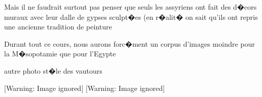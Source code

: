\documentclass{article}
\begin{document}
Mais il ne faudrait surtout pas penser que seuls les assyriens ont fait des d�cors muraux avec leur dalle de gypses sculpt�es (en r�alit� on sait qu'ils ont repris une ancienne tradition de peinture


\bigskip

Durant tout ce cours, nous aurons forc�ment un corpus d'images moindre pour la M�sopotamie que pour l'Egypte


\bigskip


\bigskip


\bigskip


\bigskip


\bigskip


\bigskip


\bigskip


\bigskip

autre photo st�le des vautours


\bigskip

  [Warning: Image ignored] %
   [Warning: Image ignored] %
 
\end{document}

